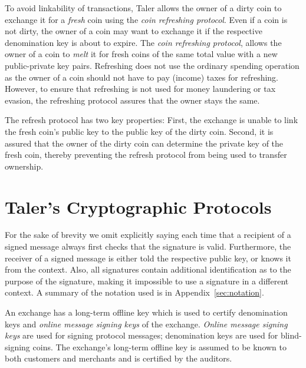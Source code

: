 \documentclass[sigconf, authordraft]{acmart}
\begin{document}
To avoid linkability of transactions, Taler allows the owner of a
dirty coin to exchange it for a {\em fresh} coin using the {\em coin
  refreshing protocol}.  Even if a coin is not dirty, the owner of a
coin may want to exchange it if the respective denomination key is
about to expire.  The {\em coin refreshing protocol}, allows the owner
of a coin to {\em melt} it for fresh coins of the same total value with a
new public-private key pairs.  Refreshing does not use the ordinary
spending operation as the owner of a coin should not have to pay
(income) taxes for refreshing.  However, to ensure that refreshing is
not used for money laundering or tax evasion, the refreshing protocol
assures that the owner stays the same.

The refresh protocol has two key properties: First, the exchange is
unable to link the fresh coin's public key to the public key of the
dirty coin.  Second, it is assured that the owner of the dirty coin
can determine the private key of the fresh coin, thereby preventing
the refresh protocol from being used to transfer ownership.


\section{Taler's Cryptographic Protocols}

\def\KDF{\textrm{KDF}}
\def\FDH{\textrm{FDH}}


For the sake of brevity we omit explicitly saying each time that a
recipient of a signed message always first checks that the signature
is valid.  Furthermore, the receiver of a signed message is either
told the respective public key, or knows it from the context.  Also,
all signatures contain additional identification as to the purpose of
the signature, making it impossible to use a signature in a different
context.  A summary of the notation used is in Appendix~\ref{sec:notation}.

An exchange has a long-term offline key which is used to certify
denomination keys and {\em online message signing keys} of the
exchange.  {\em Online message signing keys} are used for signing
protocol messages; denomination keys are used for blind-signing coins.
The exchange's long-term offline key is assumed to be known to both
customers and merchants and is certified by the auditors.
\end{document}
